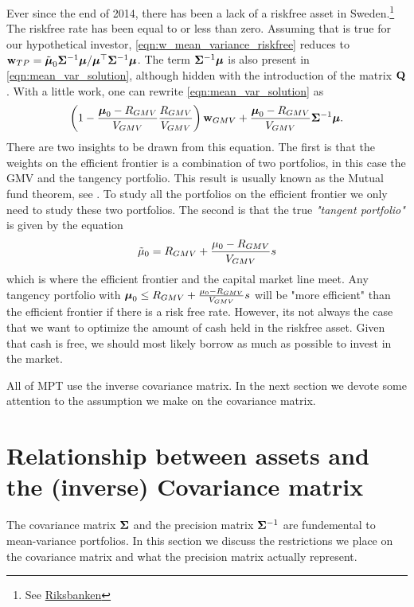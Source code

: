 \documentclass[]{book}\usepackage{knitr}
\begin{document}
Ever since the end of 2014, there has been a lack of a riskfree asset in Sweden.\footnote{See \href{https://www.riksbank.se/sv/statistik/sok-rantor--valutakurser/reporanta-in--och-utlaningsranta/}{Riksbanken}} The riskfree rate has been equal to or less than zero. Assuming that is true for our hypothetical investor, \eqref{eqn:w_mean_variance_riskfree} reduces to $\mathbf{w}_{TP} = \tilde{\mbox{\boldmath$\mu$}}_0 \mathbf{\Sigma}^{-1} \mbox{\boldmath$\mu$} / \mbox{\boldmath$\mu$}^\top \mathbf{\Sigma}^{-1} \mbox{\boldmath$\mu$}$. The term $\mathbf{\Sigma}^{-1} \mbox{\boldmath$\mu$}$ is also present in \eqref{eqn:mean_var_solution}, although hidden with the introduction of the matrix $\mathbf{Q}$. With a little work, one can rewrite \eqref{eqn:mean_var_solution} as
$$
\left(1 - \frac{\mbox{\boldmath$\mu$}_0-R_{GMV}}{V_{GMV}} \frac{R_{GMV}}{V_{GMV}} \right) \mathbf{w}_{GMV} + \frac{\mbox{\boldmath$\mu$}_0-R_{GMV}}{V_{GMV}} \mathbf{\Sigma}^{-1} \mbox{\boldmath$\mu$}.
$$
There are two insights to be drawn from this equation. The first is that the weights on the efficient frontier is a combination of two portfolios, in this case the GMV and the tangency portfolio. This result is usually known as the Mutual fund theorem, see \textcite{tobin1958liquidity}. To study all the portfolios on the efficient frontier we only need to study these two portfolios. The second is that the true \textit{"tangent portfolio"} is given by the equation
$$
\tilde\mu_0 = R_{GMV} + \frac{\mu_0-R_{GMV}}{V_{GMV}} s  
$$
which is where the efficient frontier and the capital market line meet. Any tangency portfolio with $\mbox{\boldmath$\mu$}_0\leq R_{GMV} + \frac{\mu_0-R_{GMV}}{V_{GMV}} s$ will be "more efficient" than the efficient frontier if there is a risk free rate. However, its not always the case that we want to optimize the amount of cash held in the riskfree asset. Given that cash is free, we should most likely borrow as much as possible to invest in the market. 

All of MPT use the inverse covariance matrix. In the next section we devote some attention to the assumption we make on the covariance matrix.  


\section{Relationship between assets and the (inverse) Covariance matrix}\label{subsec:cov_prec_matrix}
The covariance matrix $\mathbf{\Sigma}$ and the precision matrix $\mathbf{\Sigma}^{-1}$ are fundemental to mean-variance portfolios. In this section we discuss the restrictions we place on the covariance matrix and what the precision matrix actually represent. 
\end{document}
